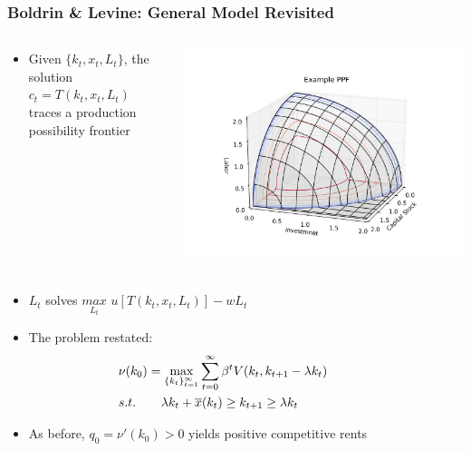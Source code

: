 \documentclass{beamer}
\begin{document}
\begin{frame}[t]\frametitle{Boldrin \& Levine: General Model Revisited}
    \begin{columns}[T]
      \begin{column}{.6\textwidth}
        \begin{minipage}[c][.35\textheight][c]{\linewidth}
        \begin{itemize}
          \item<+-> Given $\{k_t, x_t, L_t\}$, the solution $c_t = T(k_t,x_t,L_t)$ traces a production possibility frontier\\
        \end{itemize}
        \end{minipage}
    \end{column}
    \begin{column}{.45\textwidth}
      \begin{minipage}[c][.4\textheight][c]{\linewidth}
        \includegraphics[scale=.30]{example_ppf_contour.png}
          \label{fig:ppf}
        \end{minipage}
    \end{column}
  \end{columns}

  \begin{minipage}[c][.3\textheight][c]{\linewidth}
  \begin{itemize}
    \item<+-> $L_t$ solves $\underset{L_t}{max}$ $u[T(k_t,x_t,L_t)]-wL_t$
    \item<+-> The problem restated:
      \begin{align*}
        &\nu(k_0)=
        \max_{\{k_t\}_{t=1}^\infty} \sum_{t=0}^\infty\beta^tV(k_t,k_{t+1} - \lambda k_t)
          \hspace{13mm}\\
        &s.t. \ \ \ \ \ \ \lambda k_t + \overline{x}(k_t) \ge k_{t+1} \ge \lambda k_t
      \end{align*}
  \item<+-> As before, $q_0 = \nu ' (k_0) > 0$ yields positive competitive rents
  \end{itemize}
  \end{minipage}
\end{frame}
\end{document}
